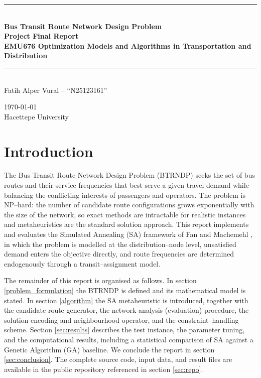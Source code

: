 \documentclass [a4paper, 11pt, titlepage] {article}
\date{\today}
\begin{document}
\setlength{\parindent}{4mm}
\renewcommand{\algorithmiccomment}[1]{//#1}

\begin{titlepage}
  \begin{center}
    \noindent\rule{\linewidth}{1mm}\\[4mm]
      {\sffamily\bfseries \Huge Bus Transit Route Network Design Problem}\\[1mm]
	{\sffamily\bfseries \Large
        Project Final Report}\\[0mm]
      {\sffamily\bfseries \Large
        EMU676 Optimization Models and Algorithms in Transportation and Distribution}\\[0mm]
    \noindent\rule{\linewidth}{1mm}\\[30mm]
    \large Fatih Alper Vural -- ``N25123161'' \\


    \large \today \\[6mm]
    Hacettepe University
  \end{center}
\end{titlepage}

\newpage
{}
\tableofcontents
\newpage
{}

\section{Introduction}
\label{introduction}

The Bus Transit Route Network Design Problem (BTRNDP) seeks the set of bus
routes and their service frequencies that best serve a given travel demand while
balancing the conflicting interests of passengers and operators. The problem is
NP--hard: the number of candidate route configurations grows exponentially with
the size of the network, so exact methods are intractable for realistic
instances and metaheuristics are the standard solution approach. This report
implements and evaluates the Simulated Annealing (SA) framework of Fan and
Machemehl \cite{fan2006}, in which the problem is modelled at the
distribution--node level, unsatisfied demand enters the objective directly, and
route frequencies are determined endogenously through a transit--assignment
model.

The remainder of this report is organised as follows. In section
\ref{problem_formulation} the BTRNDP is defined and its mathematical model is
stated. In section \ref{algorithm} the SA metaheuristic is introduced, together
with the candidate route generator, the network analysis (evaluation) procedure,
the solution encoding and neighbourhood operator, and the constraint--handling
scheme. Section \ref{sec:results} describes the test instance, the parameter
tuning, and the computational results, including a statistical comparison of SA
against a Genetic Algorithm (GA) baseline. We conclude the report in section
\ref{sec:conclusion}. The complete source code, input data, and result files are
available in the public repository referenced in section \ref{sec:repo}.
\end{document}
